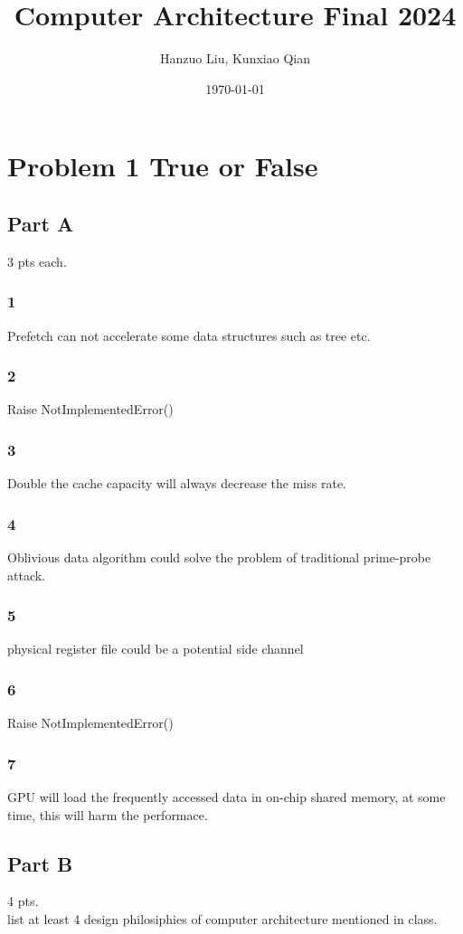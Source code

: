 \documentclass{article}
\begin{document}
\title{Computer Architecture Final 2024}
\author{Hanzuo Liu, Kunxiao Qian}
\date{\today}
\maketitle
\section*{Problem 1 True or False}
\subsection*{Part A}
3 pts each.
\subsubsection*{1}
Prefetch can not accelerate some data structures such as tree etc.
\subsubsection*{2}
Raise NotImplementedError()
\subsubsection*{3}
Double the cache capacity will always decrease the miss rate.
\subsubsection*{4}
Oblivious data algorithm could solve the problem of traditional prime-probe attack.
\subsubsection*{5}
physical register file could be a potential side channel
\subsubsection*{6}
Raise NotImplementedError()
\subsubsection*{7}
GPU will load the frequently accessed data in on-chip shared memory, at some time, this will harm the performace.
\subsection*{Part B}
4 pts.\\
list at least 4 design philosiphies of computer architecture mentioned in class.
\end{document}
